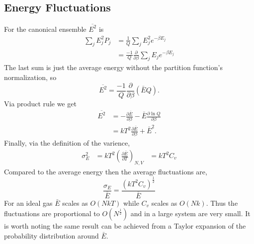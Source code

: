 \subsection{Energy Fluctuations}
For the canonical ensemble $\overline{E^2}$ is
\begin{align*}
	\sum_j{E_j^2 P_j} &= \frac{1}{Q}\sum_j{E_j^2 e^{-\beta E_j}}\\
					 &= \frac{-1}{Q} \frac{\partial}{\partial \beta}
					 \sum_j{E_j e^{-\beta E_j}}
\end{align*}
The last sum is just the average energy without the partition function's
normalization, so
\begin{equation*}
	\overline{E^2} = \frac{-1}{Q} \frac{\partial}{\partial \beta} (\bar{E}Q).
\end{equation*}
Via product rule we get
\begin{align*}
	\overline{E^2} &= -\frac{\partial\bar{E}}{\partial \beta} - \bar{E}
	\frac{\partial\ln{Q}}{\partial \beta}\\
			  &= kT^2 \frac{\partial\bar{E}}{\partial\beta} + \bar{E}^2.
\end{align*}
Finally, via the definition of the varience,
\begin{align*}
	\sigma_E^2 &= kT^2 \left( \frac{\partial\bar{E}}{\partial T} \right)_{N,V}
			   &= kT^2 C_v
\end{align*}
Compared to the average energy then the average fluctuations are,
\begin{equation*}
	\frac{\sigma_E}{\bar{E}} = \frac{(kT^2 C_v)^{\frac{1}{2}}}{\bar{E}}
\end{equation*}
For an ideal gas $\bar{E}$ scales as $O(NkT)$ while $C_v$ scales as $O(Nk)$.
Thus the fluctuations are proportional to $O(N^{\frac{1}{2}})$ and in a large
system are very small. It is worth noting the same result can be achieved from a
Taylor expansion of the probability distribution around $\bar{E}$.

